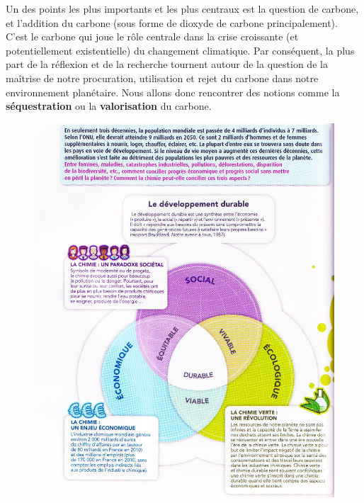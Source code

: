 \documentclass[11pt,a4paper]{article}
\begin{document}
Un des points les plus importants et les plus centraux est la question de carbone, et l’addition du carbone (sous forme de dioxyde de carbone principalement). C’est le carbone qui joue le rôle centrale dans la crise croissante (et potentiellement existentielle) du changement climatique. Par conséquent, la plus part de la réflexion et de la recherche tournent autour de la question de la maîtrise de notre procuration, utilisation et rejet du carbone dans notre environnement planétaire. Nous allons donc rencontrer des notions comme la \textbf{séquestration} ou la \textbf{valorisation} du carbone. 
\begin{figure}[H]
    \centering
    \includegraphics[width=\linewidth]{imgs/c5/vert1.jpg}
\end{figure} 
\end{document}
